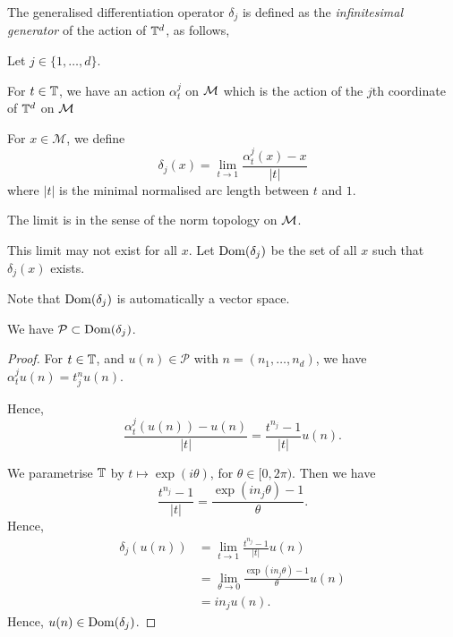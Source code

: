 The generalised differentiation operator $\delta_j$ is defined
as the \emph{infinitesimal generator} of the action of $\mathbb{T}^d$, as follows,
\begin{definition}
    Let $j \in \{1,\ldots,d\}$. 
    
    For $t \in \mathbb{T}$, we have an action $\alpha^j_t$ on $\mathcal{M}$
    which is the action of the $j$th coordinate of $\mathbb{T}^d$ on $\mathcal{M}$
    
    For $x \in \mathcal{M}$, we define 
    \begin{equation}
        \delta_j(x) = \lim_{t\rightarrow 1} \frac{\alpha^j_t(x)-x}{|t|}
    \end{equation}
    where $|t|$ is the minimal normalised arc length between $t$ and $1$.
    
    The limit is in the sense of the norm topology on $\mathcal{M}$.
    
    This limit may not exist for all $x$. Let $\operatorname{Dom}(\delta_j)$
    be the set of all $x$ such that $\delta_j(x)$ exists.
\end{definition}
Note that $\operatorname{Dom}(\delta_j)$ is automatically a vector space.



\begin{lemma}
    We have $\mathcal{P} \subset \operatorname{Dom}(\delta_j)$.
\end{lemma}
\begin{proof}
    For $t \in \mathbb{T}$, and $u(n) \in \mathcal{P}$ with $n = (n_1,\ldots,n_d)$, we have $\alpha^j_tu(n) = t^n_ju(n)$.
    
    Hence,
    \begin{equation}
        \frac{\alpha^j_t(u(n))-u(n)}{|t|} = \frac{t^{n_j}-1}{|t|}u(n).
    \end{equation}
    
    We parametrise $\mathbb{T}$ by $t\mapsto \exp( i \theta)$, for $\theta \in [0,2\pi)$. Then we
    have
    \begin{equation}
        \frac{t^{n_j}-1}{|t|} = \frac{\exp(in_j\theta)-1}{\theta}.
    \end{equation}
    Hence,
    \begin{align}
        \delta_j(u(n)) &= \lim_{t\rightarrow 1} \frac{t^{n_j}-1}{|t|}u(n)\\
                &= \lim_{\theta\rightarrow 0} \frac{\exp(in_j\theta)-1}{\theta}u(n)\\
                &= in_ju(n).
    \end{align}
    Hence, $u(n) \in \operatorname{Dom}(\delta_j)$.
\end{proof}


